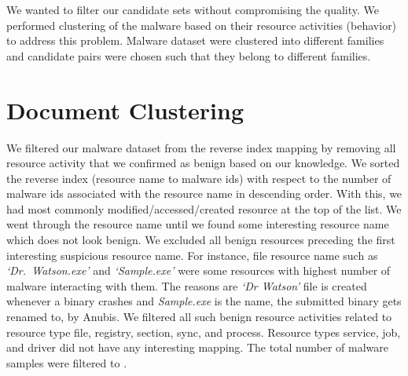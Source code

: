 We wanted to filter our candidate sets without compromising the quality.
We performed clustering of the malware based on their resource activities (behavior) to address this problem.
Malware dataset were clustered into different families and candidate pairs were chosen such that they belong to different families.
\section{Document Clustering}
\label{sec:Document Clustering}
We filtered our malware dataset from the reverse index mapping by removing all resource activity that we confirmed as benign based on our knowledge.
We sorted the reverse index (resource name to malware ids) with respect to the number of malware ids associated with the resource name in descending order.
With this, we had most commonly modified/accessed/created resource at the top of the list.
We went through the resource name until we found some interesting resource name which does not look benign.
We excluded all benign resources preceding the first interesting suspicious resource name.
For instance, file resource name such as \emph{`Dr.\ Watson.exe'} and \emph{`Sample.exe'} were some resources with highest number of malware interacting with them.
The reasons are \emph{`Dr Watson'} file is created whenever a binary crashes and \emph{Sample.exe} is the name, the submitted binary gets renamed to, by Anubis.
We filtered all such benign resource activities related to resource type file, registry, section, sync, and process.
Resource types service, job, and driver did not have any interesting mapping.
The total number of malware samples were filtered to {\gettotalmalwareiii{}}.\\


